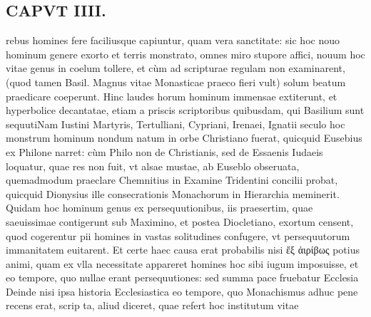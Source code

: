 \documentclass{article}
\begin{document}
\begin{pages}
\section*{CAPVT  IIII. }
\marginpar{[ p.215 ]}\pstart rebus homines fere faciliusque capiuntur, quam vera sanctitate: sic hoc nouo hominum genere exorto et terris monstrato, omnes miro stupore affici, nouum hoc vitae genus in coelum tollere, et cùm ad scripturae regulam non examinarent, (quod tamen Basil. Magnus vitae Monasticae praeco fieri vult) solum beatum praedicare coeperunt. Hinc laudes horum hominum immensae extiterunt, et hyperbolice decantatae, etiam a priscis scriptoribus quibusdam, qui Basilium sunt sequutiNam Iustini Martyris, Tertulliani, Cypriani, Irenaei, Ignatii seculo hoc monstrum hominum nondum natum in orbe Christiano fuerat, quicquid Eusebius ex Philone narret: cùm Philo non de Christianis, sed de Essaenis Iudaeis loquatur, quae res non fuit, vt alsae mustae, ab Euseblo obseruata, quemadmodum praeclare Chemnitius in Examine Tridentini concilii probat, quicquid Dionysius ille consecrationis Monachorum in Hierarchia meminerit.  \pend\pstart Quidam hoc hominum genus ex persequutionibus, iis praesertim, quae saeuissimae contigerunt sub Maximino, et postea Diocletiano, exortum censent, quod cogerentur pii homines in vastas solitudines confugere, vt persequutorum immanitatem euitarent. Et certe haec causa erat probabilis nisi ἔξ ἀιρίβως potius animi, quam ex vlla necessitate appareret homines hoc sibi iugum imposuisse, et eo tempore, quo nullae erant persequutiones: sed summa pace fruebatur Ecclesia Deinde nisi ipsa historia Ecclesiastica eo tempore, quo Monachismus adhuc pene recens erat, scrip ta, aliud diceret, quae refert hoc institutum vitae  \pend

\end{pages}
\end{document}

